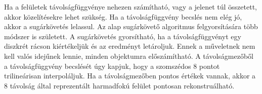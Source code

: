 Ha a felületek távolságfüggvénye nehezen számítható, vagy a jelenet túl összetett, akkor közelítésekre lehet szükség. Ha a távolságfüggvény becslés nem elég jó, akkor a sugárkövetés lelassul. Az alap sugárkövető algoritmus felgyorsítására több módszer is született. \cite{Keinert2014EnhancedST,BálintValasekAccST,QuadricTrace,RobBan} A sugárkövetés gyorsítható, ha a távolságfüggvényt egy diszkrét rácson kiértékeljük és az eredményt letároljuk. Ennek a műveletnek nem kell valós idejűnek lennie, minden objektumra előszámítható. A távolságmezőből a távolságfüggvény becslését úgy kapjuk, hogy a szomszédos 8 pontot trilineárisan interpoláljuk. Ha a távolságmezőben pontos értékek vannak, akkor a 8 távolság által reprezentált harmadfokú felület pontosan rekonstruálható. \cite{Hansson-Soderlund2022SDF}


